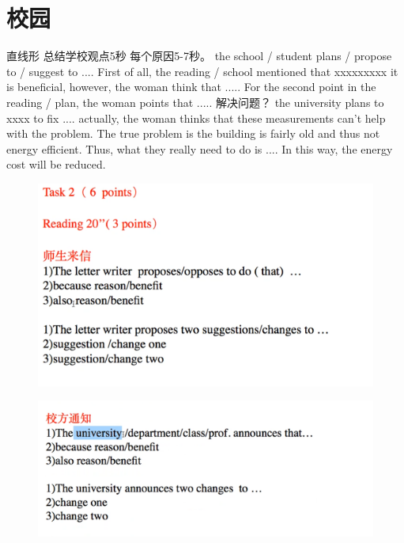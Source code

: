 \documentclass{ctexart}
\begin{document}
\section{校园}
\begin{outline}
    \1 直线形
        \2 总结学校观点5秒
        \2 每个原因5-7秒。
        \2 the school / student plans / propose to / suggest to ....
        \2 First of all, the reading / school  mentioned that xxxxxxxxx it is beneficial, however, the woman think that .....
        \2 For the second point in the reading / plan, the woman points that ..... 
    \1 解决问题？
        \2 the university plans to xxxx to fix ....
        \2 actually, the woman thinks that these measurements can't help with the problem.
        \2 The true problem is the building is fairly old and thus not energy efficient. 
        \2 Thus, what they really need to do is ....
        \2 In this way, the energy cost will be reduced.

\end{outline}
\begin{figure}[htp]
    \centering
    \includegraphics[width=.8\linewidth]{image1.png}
    \caption{}
  \end{figure}
  \begin{figure}[htp]
    \centering
    \includegraphics[width=.8\linewidth]{image2.png}
    \caption{}
  \end{figure}
\end{document}
